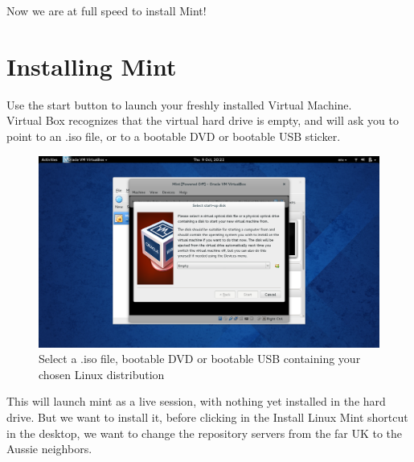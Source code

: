 \documentclass[a4paper]{article}
\begin{document}
Now we are at full speed to install Mint!

\section{Installing Mint} 
Use the start button to launch your freshly installed Virtual Machine.\\
\noindent Virtual Box recognizes that the virtual hard drive is empty, and will ask you to point to an .iso file, or to a bootable DVD or bootable USB sticker.

\begin{figure}[H]
    \centering
    \includegraphics[width=0.5\linewidth]{vb_selectdisk.png}
    \caption{Select a .iso file, bootable DVD or bootable USB containing your chosen Linux distribution}
    \label{fig:vb_selectdisk}
\end{figure}

This will launch mint as a live session, with nothing yet installed in the hard drive. But we want to install it, before clicking in the Install Linux Mint shortcut in the desktop, we want to change the repository servers from the far UK to the Aussie neighbors.
\end{document}

